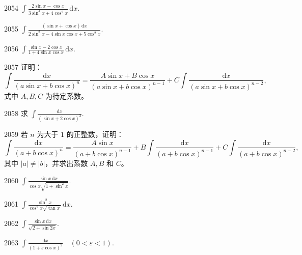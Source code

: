 
\begin{prob}[S]{2054}
$\int \frac{2\sin x - \cos x}{3\sin^2 x + 4\cos^2 x}\,\mathrm{d}x$.
\end{prob}

\begin{prob}[S]{2055}
$\int \frac{(\sin x + \cos x)\,\mathrm{d}x}{2\sin^2 x - 4\sin x \cos x + 5\cos^2 x}$.
\end{prob}

\begin{prob}[S]{2056}
$\int \frac{\sin x - 2\cos x}{1 + 4\sin x \cos x}\,\mathrm{d}x$.
\end{prob}

\begin{prob}[M]{2057}
证明：
\[
\int \frac{\mathrm{d}x}{(a\sin x + b\cos x)^n} = \frac{A\sin x + B\cos x}{(a\sin x + b\cos x)^{n-1}} + C\int \frac{\mathrm{d}x}{(a\sin x + b\cos x)^{n-2}},
\]
式中 $A, B, C$ 为待定系数。
\end{prob}

\begin{prob}[S]{2058}
求 $\int \frac{\mathrm{d}x}{(\sin x + 2\cos x)^3}$.
\end{prob}

\begin{prob}[M]{2059}
若 $n$ 为大于 $1$ 的正整数，证明：
\[
\int \frac{\mathrm{d}x}{(a + b\cos x)^n} = \frac{A\sin x}{(a + b\cos x)^{n-1}} + B\int \frac{\mathrm{d}x}{(a + b\cos x)^{n-1}} + C\int \frac{\mathrm{d}x}{(a + b\cos x)^{n-2}},
\]
其中 $|a| \neq |b|$，并求出系数 $A, B$ 和 $C$。
\end{prob}


\begin{prob}[S]{2060}
$\int \frac{\sin x \,\mathrm{d}x}{\cos x \sqrt{1 + \sin^2 x}}$.
\end{prob}

\begin{prob}[S]{2061}
$\int \frac{\sin^2 x}{\cos^2 x \sqrt{\tan x}}\,\mathrm{d}x$.
\end{prob}

\begin{prob}[S]{2062}
$\int \frac{\sin x \,\mathrm{d}x}{\sqrt{2 + \sin 2x}}$.
\end{prob}

\begin{prob}[S]{2063}
$\int \frac{\mathrm{d}x}{(1 + \varepsilon \cos x)^2} \quad (0 < \varepsilon < 1)$.
\end{prob}

